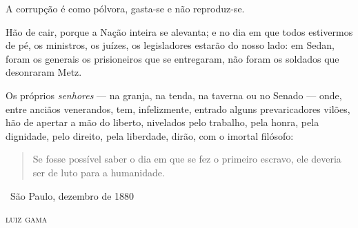 A corrupção é como pólvora, gasta-se e não reproduz-se.

Hão de cair, porque a Nação inteira se alevanta; e no dia em que todos
estivermos de pé, os ministros, os juízes, os legisladores estarão do
nosso lado: em Sedan, foram os generais os prisioneiros que se
entregaram, não foram os soldados que desonraram Metz.

Os próprios \emph{senhores} --- na granja, na tenda, na taverna ou no
Senado --- onde, entre anciãos venerandos, tem, infelizmente, entrado
alguns prevaricadores vilões, hão de apertar a mão do liberto, nivelados
pelo trabalho, pela honra, pela dignidade, pelo direito, pela liberdade,
dirão, com o imortal filósofo:

\begin{quote}
Se fosse possível saber o dia em que se fez o primeiro escravo,
ele deveria ser de luto para a humanidade.
\end{quote}

\medskip

\hfill\ São Paulo, dezembro de 1880

\hfill\textsc{luiz gama}


